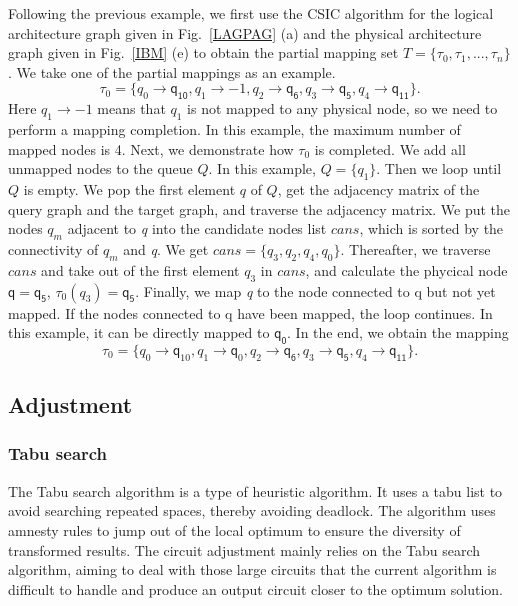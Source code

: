 \documentclass[runningheads]{llncs}
\begin{document}
\begin{example}
	Following the previous example, we first use the CSIC algorithm for the logical architecture graph given in Fig.~\ref{LAGPAG} (a) and the physical architecture graph given in Fig.~\ref{IBM} (e) to obtain the partial mapping set $T=\{\tau_{0},\tau_{1},...,\tau_{n}\}$. We take one of the partial mappings as an example.
	$$\tau_{0}=\{\textit{q}_\textit{0}\rightarrow \textsf{q}_{\textsf{10}},\textit{q}_\textit{1}\rightarrow -1,
	\textit{q}_\textit{2}\rightarrow \textsf{q}_{\textsf{6}},\textit{q}_\textit{3}\rightarrow \textsf{q}_{\textsf{5}},\textit{q}_\textit{4}\rightarrow \textsf{q}_{\textsf{11}}\}. $$ 
Here $\textit{q}_\textit{1}\rightarrow -1$ means that $\textit{q}_\textit{1}$ is not mapped to any physical node, so we need to perform a mapping completion. In this example, the maximum number of mapped nodes is 4. Next, we demonstrate how $\tau_{0}$ is completed. We add all unmapped nodes to the queue $Q$. In this example, $Q=\{\textit{q}_\textit{1}\}$. Then we loop until $Q$ is empty. We pop the first element $q$ of $Q$, get the adjacency matrix of the query graph and the target graph, and traverse the adjacency matrix. We put the nodes  $\textit{q}_\textit{m}$ adjacent to \textit{q} into the candidate nodes list $cans$, which is sorted by the connectivity of $\textit{q}_\textit{m}$ and \textit{q}. We get $cans=\{\textit{q}_\textit{3},\textit{q}_\textit{2},\textit{q}_\textit{4},\textit{q}_\textit{0}\}$. Thereafter, we traverse $cans$ and take out of the first element $\textit{q}_\textit{3}$ in $cans$, and calculate the phycical node $\textsf{q}=\textsf{q}_{\textsf{5}}$, $\tau_0(\textit{q}_\textit{3})=\textsf{q}_{\textsf{5}}$. Finally, we map \textit{q} to the node connected to \textsf{q} but not yet mapped. If the nodes connected to \textsf{q} have been mapped, the loop continues. In this example, it can be directly mapped to $\textsf{q}_{\textsf{0}}$. In the end, we obtain the mapping $$ \tau_{0}=\{\textit{q}_\textit{0}\rightarrow  \textsf{q}_{10},\textit{q}_\textit{1}\rightarrow \textsf{q}_{0},	\textit{q}_\textit{2}\rightarrow  \textsf{q}_{\textsf{6}},\textit{q}_\textit{3}\rightarrow  \textsf{q}_{\textsf{5}},\textit{q}_\textit{4}\rightarrow  \textsf{q}_{\textsf{11}}\}. $$
	\end{example}
\subsection{Adjustment}
\subsubsection{Tabu search}
The Tabu search algorithm is a type of heuristic algorithm. It uses a tabu list to avoid searching repeated spaces, thereby avoiding deadlock. The algorithm uses amnesty rules to jump out of the local optimum to ensure the diversity of transformed results. The circuit adjustment mainly relies on the Tabu search algorithm, aiming to deal with those large circuits that the current algorithm is difficult to handle and produce an output circuit closer to the optimum solution.
\end{document}
